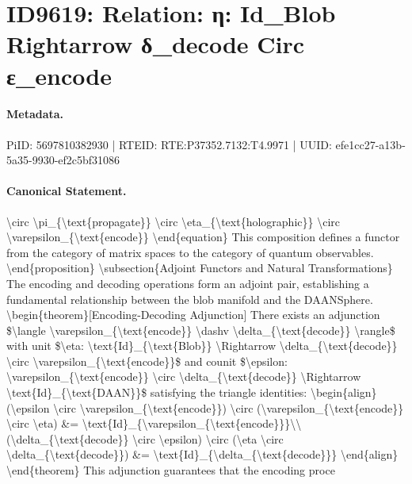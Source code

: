 \section*{ID9619: Relation: η: Id\_Blob Rightarrow δ\_decode Circ ε\_encode}
\paragraph{Metadata.}
PiID: 5697810382930 | RTEID: RTE:P37352.7132:T4.9971 | UUID: efe1cc27-a13b-5a35-9930-ef2c5bf31086

\paragraph{Canonical Statement.}
\textbackslash{}circ \textbackslash{}pi\_\{\textbackslash{}text\{propagate\}\} \textbackslash{}circ \textbackslash{}eta\_\{\textbackslash{}text\{holographic\}\} \textbackslash{}circ \textbackslash{}varepsilon\_\{\textbackslash{}text\{encode\}\} \textbackslash{}end\{equation\} This composition defines a functor from the category of matrix spaces to the category of quantum observables. \textbackslash{}end\{proposition\} \textbackslash{}subsection\{Adjoint Functors and Natural Transformations\} The encoding and decoding operations form an adjoint pair, establishing a fundamental relationship between the blob manifold and the DAANSphere. \textbackslash{}begin\{theorem\}[Encoding-Decoding Adjunction] There exists an adjunction \$\textbackslash{}langle \textbackslash{}varepsilon\_\{\textbackslash{}text\{encode\}\} \textbackslash{}dashv \textbackslash{}delta\_\{\textbackslash{}text\{decode\}\} \textbackslash{}rangle\$ with unit \$\textbackslash{}eta: \textbackslash{}text\{Id\}\_\{\textbackslash{}text\{Blob\}\} \textbackslash{}Rightarrow \textbackslash{}delta\_\{\textbackslash{}text\{decode\}\} \textbackslash{}circ \textbackslash{}varepsilon\_\{\textbackslash{}text\{encode\}\}\$ and counit \$\textbackslash{}epsilon: \textbackslash{}varepsilon\_\{\textbackslash{}text\{encode\}\} \textbackslash{}circ \textbackslash{}delta\_\{\textbackslash{}text\{decode\}\} \textbackslash{}Rightarrow \textbackslash{}text\{Id\}\_\{\textbackslash{}text\{DAAN\}\}\$ satisfying the triangle identities: \textbackslash{}begin\{align\} (\textbackslash{}epsilon \textbackslash{}circ \textbackslash{}varepsilon\_\{\textbackslash{}text\{encode\}\}) \textbackslash{}circ (\textbackslash{}varepsilon\_\{\textbackslash{}text\{encode\}\} \textbackslash{}circ \textbackslash{}eta) \&= \textbackslash{}text\{Id\}\_\{\textbackslash{}varepsilon\_\{\textbackslash{}text\{encode\}\}\}\textbackslash{}\textbackslash{} (\textbackslash{}delta\_\{\textbackslash{}text\{decode\}\} \textbackslash{}circ \textbackslash{}epsilon) \textbackslash{}circ (\textbackslash{}eta \textbackslash{}circ \textbackslash{}delta\_\{\textbackslash{}text\{decode\}\}) \&= \textbackslash{}text\{Id\}\_\{\textbackslash{}delta\_\{\textbackslash{}text\{decode\}\}\} \textbackslash{}end\{align\} \textbackslash{}end\{theorem\} This adjunction guarantees that the encoding proce

